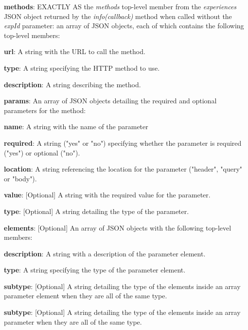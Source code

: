\begin{myEnumerate}
\begin{myEnumerate}
        \item \textbf{methods}: EXACTLY AS the \textit{methods} top-level member from the \textit{experiences} JSON object returned by the \textit{info(callback)} method when called without the \textit{expId} parameter: an array of JSON objects, each of which contains the following top-level members:
        \begin{myEnumerate}
            \item \textbf{url}: A string with the URL to call the method.
            \item \textbf{type}: A string specifying the HTTP method to use.
            \item \textbf{description}: A string describing the method.
           \item \textbf{params}: An array of JSON objects detailing the required and optional parameters for the method:
            \begin{myEnumerate}
                \item \textbf{name}: A string with the name of the parameter
                \item \textbf{required}: A string ("yes" or "no") specifying whether the parameter is required ("yes") or optional ("no").
                \item \textbf{location}: A string referencing the location for the parameter ("header", "query" or "body").
                \item \textbf{value}: [Optional] A string with the required value for the parameter.
                \item \textbf{type}: [Optional] A string detailing the type of the parameter.
                \item \textbf{elements}: [Optional] An array of JSON objects with the following top-level members:
                \begin{myEnumerate}
                    \item \textbf{description}: A string with a description of the parameter element.
                    \item \textbf{type}: A string specifying the type of the parameter element.
                    \item \textbf{subtype}: [Optional] A string detailing the type of the elements inside an array parameter element when they are all of the same type.
                \end{myEnumerate}
                \item \textbf{subtype}: [Optional] A string detailing the type of the elements inside an array parameter when they are all of the same type.

\end{myEnumerate}
\end{myEnumerate}
\end{myEnumerate}
\end{myEnumerate}
